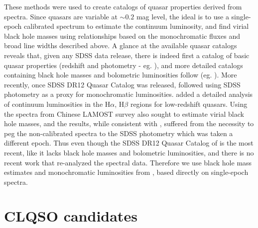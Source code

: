 \documentclass[twocolumn]{aastex62}
\begin{document}
These methods were used to create catalogs of quasar properties derived from spectra. Since quasars are variable at ${\sim}0.2$ mag level, the ideal is to use a single-epoch calibrated spectrum to estimate the continuum luminosity, and find virial black hole masses using relationships based on the monochromatic fluxes and broad line widths described above. A glance at the available quasar catalogs reveals that, given any SDSS data release, there is indeed first a catalog of basic quasar properties (redshift and photometry - eg. \citealt{schneider2007, schneider2010}), and more detailed catalogs containing black hole masses and bolometric luminosities  follow (eg. \citealt{shen2008, shen2011}). More recently, once SDSS DR12 Quasar Catalog \citep{paris2017} was released,  \citealt{kozlowski2017a} followed using SDSS photometry as a proxy for monochromatic luminosities. \citet{chen2018} added a detailed analysis of continuum luminosities in the  H$\alpha$, H$\beta$ regions for low-redshift quasars. Using the spectra from Chinese LAMOST survey \citet{dong2018} also sought to estimate virial black hole masses, and the results, while consistent with \citet{shen2011}, suffered from the necessity to peg the non-calibrated spectra to the SDSS photometry which was taken  a different epoch. Thus even though the SDSS DR12 Quasar Catalog of \cite{paris2018}  is the most recent, like \citet{paris2017} it lacks black hole masses and bolometric luminosities, and there is no recent work that re-analyzed the spectral data. Therefore we use black hole mass estimates and monochromatic luminosities from \citet{shen2011}, based directly on single-epoch spectra. 






\section{CLQSO candidates}
\label{app:clqso_cands}
\end{document}

